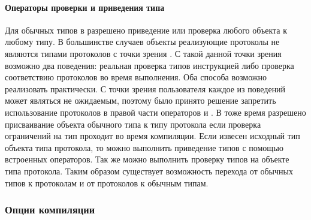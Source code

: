 \paragraph{Операторы проверки и приведения типа}
Для обычных типов в  разрешено приведение или проверка любого объекта к любому типу. В большинстве случаев объекты реализующие протоколы не являются типами протоколов с точки зрения . С такой данной точки зрения возможно два поведения: реальная проверка типов инструкцией  либо проверка соответствию протоколов во время выполнения. Оба способа возможно реализовать практически. С точки зрения пользователя каждое из поведений может являться не ожидаемым, поэтому было принято решение запретить использование протоколов в правой части операторов  и . В тоже время разрешено присваивание объекта обычного типа к типу протокола если проверка ограничений на тип проходит во время компиляции. Если извесен исходный тип объекта типа протокола, то можно выполнить приведение типов с помощью встроенных операторов. Так же можно выполнить проверку типов на объекте типа протокола. Таким образом существует возможность перехода от обычных типов к протоколам и от протоколов к обычным типам.

\subsubsection{Опции компиляции}

